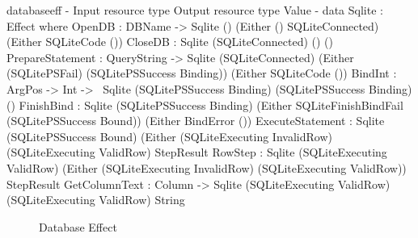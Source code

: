 \begin{SaveVerbatim}{databaseeff}
{-                           { Input resource type }    { Output resource type }             { Value }           -}
data Sqlite : Effect where
  OpenDB            : DBName -> 
                      Sqlite ()                         (Either () SQLiteConnected)          (Either SQLiteCode ())
  CloseDB           : Sqlite (SQLiteConnected)          ()                                   ()
  PrepareStatement  : QueryString -> 
                      Sqlite (SQLiteConnected)          (Either (SQLitePSFail) 
                                                          (SQLitePSSuccess Binding))         (Either SQLiteCode ())
  BindInt           : ArgPos -> Int -> 
                      Sqlite (SQLitePSSuccess Binding)  (SQLitePSSuccess Binding)            ()
  FinishBind        : Sqlite (SQLitePSSuccess Binding)  (Either SQLiteFinishBindFail
                                                          (SQLitePSSuccess Bound))           (Either BindError ())
  ExecuteStatement  : Sqlite (SQLitePSSuccess Bound)    (Either (SQLiteExecuting InvalidRow)
                                                          (SQLiteExecuting ValidRow)         StepResult
  RowStep           : Sqlite (SQLiteExecuting ValidRow) (Either (SQLiteExecuting InvalidRow)
                                                          (SQLiteExecuting ValidRow))        StepResult
  GetColumnText     : Column -> 
                      Sqlite (SQLiteExecuting ValidRow) (SQLiteExecuting ValidRow)           String

\end{SaveVerbatim}

\begin{figure*}[t]
\begin{center}
\end{center}
\caption{Database Effect}
\label{fig:dbeffect}
\end{figure*}

